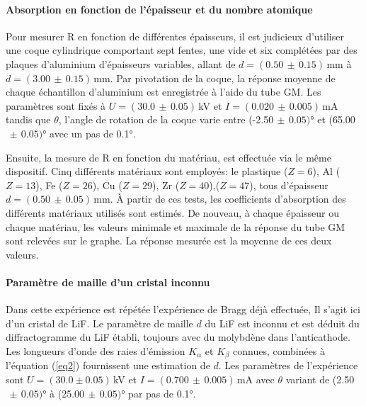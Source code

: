 \documentclass[a4paper, 12pt,oneside]{article}
\begin{document}
\paragraph{Absorption en fonction de l'épaisseur et du nombre atomique}

Pour mesurer R en fonction de différentes épaisseurs, il est judicieux d'utiliser une coque cylindrique comportant sept fentes, une vide et six complétées par des plaques d’aluminium d’épaisseurs variables, allant de $d=(0.50\,\pm\, 0.15)$\,mm à $d=(3.00\,\pm\, 0.15)$\,mm. Par pivotation de la coque, la réponse moyenne de chaque échantillon d'aluminium est enregistrée à l'aide du tube GM. Les paramètres sont fixés à $U=(30.0\,\pm\,0.05)$\,kV et $I=(0.020\,\pm\,0.005)$\,mA tandis que $\theta$, l'angle de rotation de la coque varie entre (-2.50$\,\pm\,0.05)$° et (65.00$\,\pm\,0.05)$° avec un pas de 0.1°. 

Ensuite, la mesure de R en fonction du matériau, est effectuée via le même dispositif. Cinq différents matériaux sont employés: le plastique ($Z = 6$), Al ($Z = 13$), Fe ($Z = 26$), Cu ($Z = 29$), Zr ($Z = 40$),($Z = 47$), tous d'épaisseur $d=(0.50\,\pm\, 0.05)$\,mm. À partir de ces tests, les coefficients d'absorption des différents matériaux utilisés sont estimés. De nouveau, à chaque épaisseur ou chaque matériau, les valeurs minimale et maximale de la réponse du tube GM sont relevées sur le graphe. La réponse mesurée est la moyenne de ces deux valeurs.
\vspace{-0.5cm}

\paragraph{Paramètre de maille d'un cristal inconnu}
Dans cette expérience est répétée l'expérience de Bragg déjà effectuée, Il s'agit ici d'un cristal de LiF. Le paramètre de maille $d$ du LiF est inconnu et est déduit du diffractogramme du LiF établi, toujours avec du molybdène dans l'anticathode. Les longueurs d'onde des raies d'émission $K_{\alpha}$ et $K_{\beta}$ connues, combinées à l'équation (\ref{eq2}) fournissent une estimation de $d$. Les paramètres de l'expérience sont $U=(30.0\pm0.05)\,$kV et $I=(0.700\,\pm\,0.005)$\,mA avec $\theta$ variant de (2.50$\,\pm\,0.05)$° à (25.00$\,\pm\,0.05)$° par pas de 0.1°.
\vspace{-0.5cm}
\end{document}
